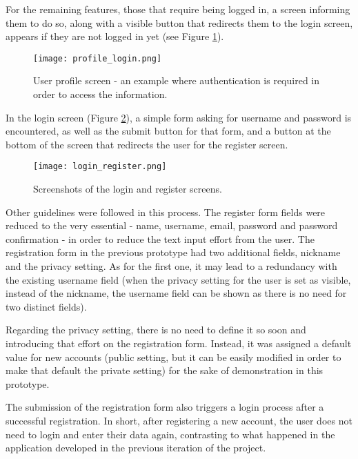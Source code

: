 For the remaining features, those that require being logged in, a screen informing them to do so, along with a visible button that redirects them to the login screen, appears if they are not logged in yet (see Figure \ref{fig:auth1}). 

\begin{figure}[h!]
  \begin{center}
    \leavevmode
    \texttt{[image: profile\_login.png]}
    \caption{User profile screen - an example where authentication is required in order to access the information.}
    \label{fig:auth1}
  \end{center}
\end{figure}

In the login screen (Figure \ref{fig:auth2}), a simple form asking for username and password is encountered, as well as the submit button for that form, and a button at the bottom of the screen that redirects the user for the register screen.

\begin{figure}[h!]
  \begin{center}
    \leavevmode
    \texttt{[image: login\_register.png]}
    \caption{Screenshots of the login and register screens.}
    \label{fig:auth2}
  \end{center}
\end{figure}

Other guidelines were followed in this process. The register form fields were reduced to the very essential - name, username, email, password and password confirmation - in order to reduce the text input effort from the user. The registration form in the previous prototype had two additional fields, nickname and the privacy setting. As for the first one, it may lead to a redundancy with the existing username field (when the privacy setting for the user is set as visible, instead of the nickname, the username field can be shown as there is no need for two distinct fields). 

Regarding the privacy setting, there is no need to define it so soon and introducing that effort on the registration form. Instead, it was assigned a default value for new accounts (public setting, but it can be easily modified in order to make that default the private setting) for the sake of demonstration in this prototype.

The submission of the registration form also triggers a login process after a successful registration. In short, after registering a new account, the user does not need to login and enter their data again, contrasting to what happened in the application developed in the previous iteration of the project.

